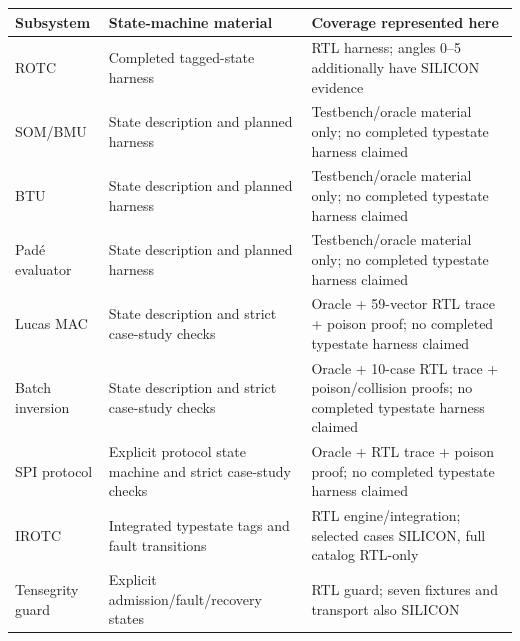 \documentclass[11pt]{article}
\begin{document}
\begin{center}

\scriptsize

\sloppy

\begin{tabularx}{\linewidth}{@{}YYY@{}}

\toprule

Subsystem & State-machine material & Coverage represented here \\

\midrule

ROTC & Completed tagged-state harness & RTL harness; angles 0–5 additionally have SILICON evidence \\

SOM/BMU & State description and planned harness & Testbench/oracle material only; no completed typestate harness claimed \\

BTU & State description and planned harness & Testbench/oracle material only; no completed typestate harness claimed \\

Padé evaluator & State description and planned harness & Testbench/oracle material only; no completed typestate harness claimed \\

Lucas MAC & State description and strict case-study checks & Oracle + 59-vector RTL trace + poison proof; no completed typestate harness claimed \\

Batch inversion & State description and strict case-study checks & Oracle + 10-case RTL trace + poison/collision proofs; no completed typestate harness claimed \\

SPI protocol & Explicit protocol state machine and strict case-study checks & Oracle + RTL trace + poison proof; no completed typestate harness claimed \\

IROTC & Integrated typestate tags and fault transitions & RTL engine/integration; selected cases SILICON, full catalog RTL-only \\

Tensegrity guard & Explicit admission/fault/recovery states & RTL guard; seven fixtures and transport also SILICON \\

\bottomrule

\end{tabularx}

\end{center}
\end{document}
